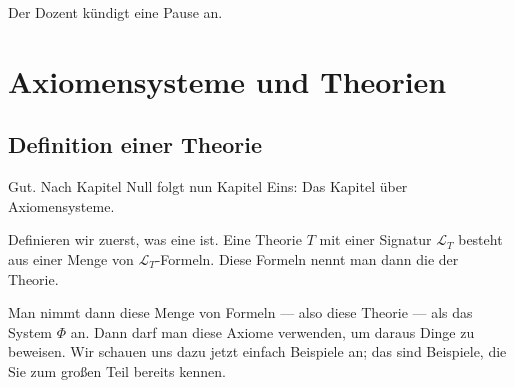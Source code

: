 \begin{math-stroke}

\end{math-stroke}

\begin{lecture-break}[Pause]
Der Dozent kündigt eine Pause an.
\end{lecture-break}

\section{Axiomensysteme und Theorien}
\subsection{Definition einer Theorie}

\begin{spoken-clean}[01:19:32 - 01:21:42]
Gut. Nach Kapitel Null folgt nun Kapitel Eins: Das Kapitel über Axiomensysteme.

Definieren wir zuerst, was eine  ist. Eine Theorie $T$ mit einer Signatur $\mathcal{L}_T$ besteht aus einer Menge von $\mathcal{L}_T$-Formeln. Diese Formeln nennt man dann die  der Theorie.

Man nimmt dann diese Menge von Formeln --- also diese Theorie --- als das System $\Phi$ an. Dann darf man diese Axiome verwenden, um daraus Dinge zu beweisen. Wir schauen uns dazu jetzt einfach Beispiele an; das sind Beispiele, die Sie zum großen Teil bereits kennen.
\end{spoken-clean}

\begin{math-stroke}
\end{math-stroke}

